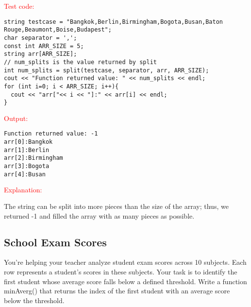 \begin{sample}
\textcolor{red}{Test code:}
\begin{verbatim}
string testcase = "Bangkok,Berlin,Birmingham,Bogota,Busan,Baton Rouge,Beaumont,Boise,Budapest";
char separator = ',';
const int ARR_SIZE = 5;
string arr[ARR_SIZE];
// num_splits is the value returned by split
int num_splits = split(testcase, separator, arr, ARR_SIZE);
cout << "Function returned value: " << num_splits << endl;
for (int i=0; i < ARR_SIZE; i++){
  cout << "arr["<< i << "]:" << arr[i] << endl;
}
\end{verbatim}
\textcolor{red}{Output:}
\begin{verbatim}
Function returned value: -1
arr[0]:Bangkok
arr[1]:Berlin
arr[2]:Birmingham
arr[3]:Bogota
arr[4]:Busan
\end{verbatim}

\textcolor{red}{Explanation:}

The string can be split into more pieces than the size of the array; thus, we returned -1 and filled the array with as many pieces as possible.

\end{sample}

\subsection{School Exam Scores}

You’re helping your teacher analyze student exam scores across 10 subjects. Each row represents a student’s scores in these subjects. Your task is to identify the first student whose average score falls below a defined threshold. Write a function minAverg() that returns the index of the first student with an average score below the threshold.

